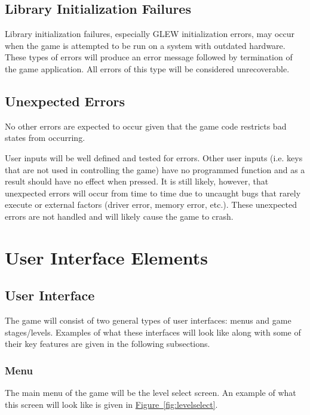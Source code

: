 \documentclass[12pt, titlepage]{article}
\begin{document}
\subsection{Library Initialization Failures}
Library initialization failures, especially GLEW initialization errors, may occur when the game is attempted to be run on a system with outdated hardware.  These types of errors will produce an error message followed by termination of the game application.  All errors of this type will be considered unrecoverable.

\subsection{Unexpected Errors}
No other errors are expected to occur given that the game code restricts bad states from occurring.

 User inputs will be well defined and tested for errors.  Other user inputs (i.e. keys that are not used in controlling the game) have no programmed function and as a result should have no effect when pressed.  It is still likely, however, that unexpected errors will occur from time to time due to uncaught bugs that rarely execute or external factors (driver error, memory error, etc.).  These unexpected errors are not handled and will likely cause the game to crash.

\section{User Interface Elements}

\subsection{User Interface}
The game will consist of two general types of user interfaces:  menus and game stages/levels.  Examples of what these interfaces will look like along with some of their key features are given in the following subsections.

\subsubsection{Menu}
The main menu of the game will be the level select screen.  An example of what this screen will look like is given in  \hyperref[fig:levelselect]{Figure~\ref*{fig:levelselect}}.

\newpage
\end{document}
